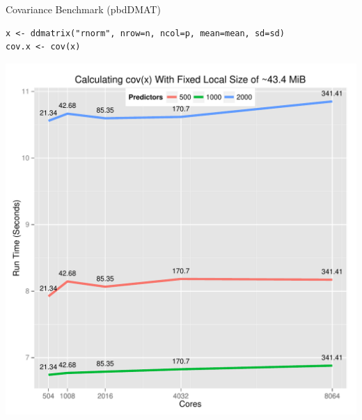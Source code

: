 \begin{frame}[fragile]
  \begin{block}{Covariance Benchmark (pbdDMAT)}
    \vspace{-3ex}\scriptsize
    \begin{lstlisting}
x <- ddmatrix("rnorm", nrow=n, ncol=p, mean=mean, sd=sd)
cov.x <- cov(x)
    \end{lstlisting}
    \vspace{-4ex}
    \begin{center}
      \includegraphics[trim=3mm 1mm 2mm 11.5mm,clip,height=.78\textheight]{../common/pics/cov}
    \end{center}
  \end{block}
\end{frame}

